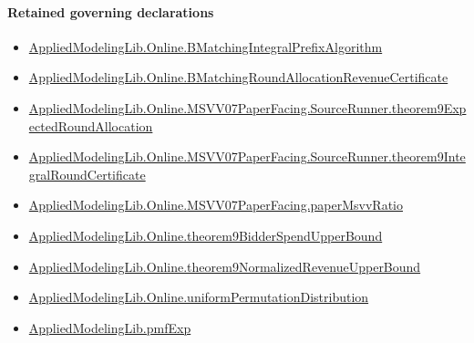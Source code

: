 \documentclass[10pt]{article}
\begin{document}
\paragraph{Retained governing declarations}
\begin{itemize}\raggedright
\item \hyperlink{governing-declaration-736ec20594878fea}{Applied\allowbreak{}Modeling\allowbreak{}Lib.\allowbreak{}Online.\allowbreak{}B\allowbreak{}Matching\allowbreak{}Integral\allowbreak{}Prefix\allowbreak{}Algorithm}
\item \hyperlink{governing-declaration-ff95aa44af6615ac}{Applied\allowbreak{}Modeling\allowbreak{}Lib.\allowbreak{}Online.\allowbreak{}B\allowbreak{}Matching\allowbreak{}Round\allowbreak{}Allocation\allowbreak{}Revenue\allowbreak{}Certificate}
\item \hyperlink{governing-declaration-e93c3b888be1a5ee}{Applied\allowbreak{}Modeling\allowbreak{}Lib.\allowbreak{}Online.\allowbreak{}MSVV07\allowbreak{}Paper\allowbreak{}Facing.\allowbreak{}Source\allowbreak{}Runner.\allowbreak{}theorem9\allowbreak{}Expected\allowbreak{}Round\allowbreak{}Allocation}
\item \hyperlink{governing-declaration-107688d053ee6761}{Applied\allowbreak{}Modeling\allowbreak{}Lib.\allowbreak{}Online.\allowbreak{}MSVV07\allowbreak{}Paper\allowbreak{}Facing.\allowbreak{}Source\allowbreak{}Runner.\allowbreak{}theorem9\allowbreak{}Integral\allowbreak{}Round\allowbreak{}Certificate}
\item \hyperlink{governing-declaration-11865634591d1a39}{Applied\allowbreak{}Modeling\allowbreak{}Lib.\allowbreak{}Online.\allowbreak{}MSVV07\allowbreak{}Paper\allowbreak{}Facing.\allowbreak{}paper\allowbreak{}Msvv\allowbreak{}Ratio}
\item \hyperlink{governing-declaration-66cfae5ffb275704}{Applied\allowbreak{}Modeling\allowbreak{}Lib.\allowbreak{}Online.\allowbreak{}theorem9\allowbreak{}Bidder\allowbreak{}Spend\allowbreak{}Upper\allowbreak{}Bound}
\item \hyperlink{governing-declaration-6c856b60345ac99f}{Applied\allowbreak{}Modeling\allowbreak{}Lib.\allowbreak{}Online.\allowbreak{}theorem9\allowbreak{}Normalized\allowbreak{}Revenue\allowbreak{}Upper\allowbreak{}Bound}
\item \hyperlink{governing-declaration-c18ea041e6faea64}{Applied\allowbreak{}Modeling\allowbreak{}Lib.\allowbreak{}Online.\allowbreak{}uniform\allowbreak{}Permutation\allowbreak{}Distribution}
\item \hyperlink{governing-declaration-8e4b4389a4f6454b}{Applied\allowbreak{}Modeling\allowbreak{}Lib.\allowbreak{}pmf\allowbreak{}Exp}
\end{itemize}
\end{document}

